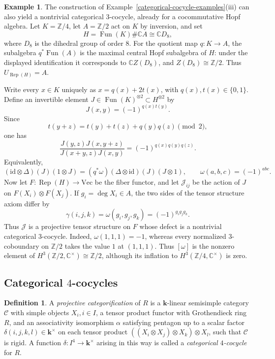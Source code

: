 \documentclass[12pt]{amsart}
\numberwithin{equation}{section}
\theoremstyle{definition}
\newtheorem{definition}[theorem]{Definition}
\newtheorem{example}[theorem]{Example}
\newcommand{\id}{\text{id}}
\newcommand{\Rep}{\text{Rep}}
\newcommand{\1}{_{(1)}}
\newcommand{\2}{_{(2)}}
\newcommand{\3}{_{(3)}}
\newcommand{\4}{_{(4)}}
\newcommand{\5}{_{(5)}}
\newcommand{\6}{_{(6)}}
\newcommand{\C}{\mathcal{C}}
\theoremstyle{plain}
\theoremstyle{definition}
\theoremstyle{remark}
\def\C{\mathcal{C}}
\def\Vec{\mathrm{Vec}}
\def\k{\mathbf{k}}
\def\Rep{\mathop{\mathrm{Rep}}\nolimits}
\begin{document}
\begin{example}
The construction of Example~\ref{categorical-cocycle-examples}(iii) can also yield a nontrivial categorical $3$-cocycle, already for a cocommutative Hopf algebra. Let $K=\mathbb Z/4$, let $A=\mathbb Z/2$ act on $K$ by inversion, and set
\[
H=\operatorname{Fun}(K)\#\mathbb C A\cong \mathbb C D_8,
\]
where $D_8$ is the dihedral group of order $8$. For the quotient map $q:K\to A$, the subalgebra $q^*\operatorname{Fun}(A)$ is the maximal central Hopf subalgebra of $H$: under the displayed identification it corresponds to $\mathbb C Z(D_8)$, and $Z(D_8)\cong\mathbb Z/2$. Thus $U_{\Rep(H)}=A$.

Write every $x\in K$ uniquely as $x=q(x)+2t(x)$, with $q(x),t(x)\in\{0,1\}$. Define an invertible element $J\in\operatorname{Fun}(K)^{\otimes 2}\subset H^{\otimes 2}$ by
\[
J(x,y)=(-1)^{q(x)t(y)}.
\]
Since
\[
t(y+z)=t(y)+t(z)+q(y)q(z)\pmod 2,
\]
one has
\[
\frac{J(y,z)J(x,y+z)}{J(x+y,z)J(x,y)}
=(-1)^{q(x)q(y)q(z)}.
\]
Equivalently,
\[
(\id\otimes\Delta)(J)(1\otimes J)
=(q^*\omega)(\Delta\otimes\id)(J)(J\otimes1),
\qquad
\omega(a,b,c)=(-1)^{abc}.
\]
Now let $F:\Rep(H)\to\Vec$ be the fiber functor, and let $\mathcal J_{ij}$ be the action of $J$ on $F(X_i)\otimes F(X_j)$. If $g_i=\deg X_i\in A$, the two sides of the tensor structure axiom differ by
\[
\gamma(i,j,k)=\omega(g_i,g_j,g_k)=(-1)^{g_i g_j g_k}.
\]
Thus $\mathcal J$ is a projective tensor structure on $F$ whose defect is a nontrivial categorical $3$-cocycle. Indeed, $\omega(1,1,1)=-1$, whereas every normalized $3$-coboundary on $\mathbb Z/2$ takes the value $1$ at $(1,1,1)$. Thus $[\omega]$ is the nonzero element of $H^3(\mathbb Z/2,\mathbb C^\times)\cong\mathbb Z/2$, although its inflation to $H^3(\mathbb Z/4,\mathbb C^\times)$ is zero.
\end{example}

\subsection{Categorical $4$-cocycles} 
\begin{definition} A {\it projective categorification} of $R$ is a $\k$-linear semisimple  category $\C$ with simple objects $X_i,i\in I$, a tensor product functor with Grothendieck ring $R$, and an associativity isomorphism $\alpha$ satisfying pentagon up to a scalar factor $\delta(i,j,k,l)\in \k^\times$ on each tensor product $((X_i\otimes X_j)\otimes X_k)\otimes X_l$, such that $\C$ is rigid.  A function $\delta: I^4\to \k^\times$ arising in this way is called a {\it categorical $4$-cocycle} for $R$. 
\end{definition} 
\end{document}
